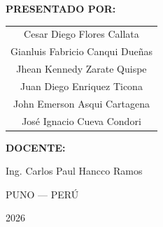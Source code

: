 \begin{titlepage}
\vspace{0.95cm}

{\normalsize\textbf{PRESENTADO POR:}\par}
\vspace{0.3cm}
\begin{tabular}{c}
Cesar Diego Flores Callata \\
Gianluis Fabricio Canqui Dueñas \\
Jhean Kennedy Zarate Quispe \\
Juan Diego Enriquez Ticona \\
John Emerson Asqui Cartagena \\
José Ignacio Cueva Condori \\
\end{tabular}

\vspace{0.95cm}

{\normalsize\textbf{DOCENTE:}\par}
\vspace{0.25cm}
{\normalsize Ing. Carlos Paul Hancco Ramos\par}

\vfill

{\normalsize PUNO --- PERÚ\par}
\vspace{0.15cm}
{\normalsize 2026\par}

\end{titlepage}
